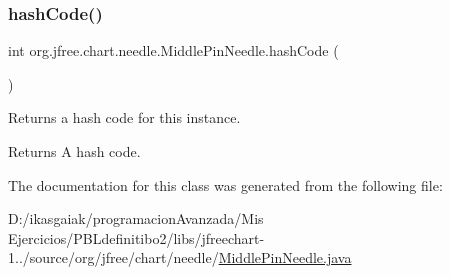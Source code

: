 \subsubsection{\texorpdfstring{hash\+Code()}{hashCode()}}
{\footnotesize\ttfamily int org.\+jfree.\+chart.\+needle.\+Middle\+Pin\+Needle.\+hash\+Code (\begin{DoxyParamCaption}{ }\end{DoxyParamCaption})}

Returns a hash code for this instance.

\begin{DoxyReturn}{Returns}
A hash code. 
\end{DoxyReturn}


The documentation for this class was generated from the following file\+:\begin{DoxyCompactItemize}
\item 
D\+:/ikasgaiak/programacion\+Avanzada/\+Mis Ejercicios/\+P\+B\+Ldefinitibo2/libs/jfreechart-\/1../source/org/jfree/chart/needle/\mbox{\hyperlink{_middle_pin_needle_8java}{Middle\+Pin\+Needle.\+java}}\end{DoxyCompactItemize}
